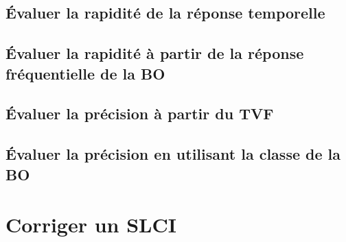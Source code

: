 \graphicspath{{\repStyle/png/}{../PERF/PERF-02-Marges/62_Palettisation/images/}} 
 
 
\graphicspath{{\repStyle/png/}{../PERF/PERF-02-Marges/63_BancHydraulique/images/}} 
 
 
\graphicspath{{\repStyle/png/}{../PERF/PERF-02-Marges/64_EPAS/images/}} 
 
 
\clearpage 
\newpage 
\section{Évaluer la rapidité de la réponse temporelle} 
\clearpage 
\newpage 
\section{Évaluer la rapidité à partir de la réponse fréquentielle de la BO} 
\clearpage 
\newpage 
\section{Évaluer la précision à partir du TVF} 
\graphicspath{{\repStyle/png/}{../PERF/PERF-05-Precistion-TVF/501_Divers/images/}} 
 
 
\graphicspath{{\repStyle/png/}{../PERF/PERF-05-Precistion-TVF/509_Divers/images/}} 
 
 
\clearpage 
\newpage 
\section{Évaluer la précision en utilisant la classe de la BO} 
\graphicspath{{\repStyle/png/}{../PERF/PERF-06-Precision/63_BancHydraulique/images/}} 
 
 
\graphicspath{{\repStyle/png/}{../PERF/PERF-06-Precision/64_EPAS/images/}} 
 
 
\graphicspath{{\repStyle/png/}{../PERF/PERF-06-Precision/73_Bassin/images/}} 
 
 
\clearpage 
\newpage 
\setchapterpreamble[u]{\margintoc} 
\chapter{Corriger un SLCI} 
